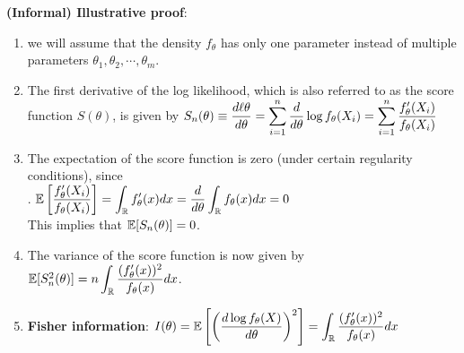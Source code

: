 \vspace{0.5cm}
\textbf{(Informal) Illustrative proof}:
\begin{enumerate}
    \item we will assume that the density $f_{\theta}$ has only one parameter instead of multiple parameters $\theta_1 , \theta_2, \cdots , \theta_m $.
    \hfill \cite{statistics/book/Statistics-for-Data-Scientists/Maurits-Kaptein}

    \item The first derivative of the log likelihood, which is also referred to as the score function $S(\theta)$, is given by
    $
        S_n (\theta )
        \equiv \dfrac{d\ell\theta }{d\theta}
        = \displaystyle\sum^n _{i=1} \dfrac{d} {d\theta}  \log f_\theta  (X_i )
        = \displaystyle\sum^n _{i=1} \dfrac{f^\prime_\theta  (X_i ) }{f_{\theta}  (X_i )}
    $
    \hfill \cite{statistics/book/Statistics-for-Data-Scientists/Maurits-Kaptein}

    \item The expectation of the score function is zero (under certain regularity conditions), since
    \hfill \cite{statistics/book/Statistics-for-Data-Scientists/Maurits-Kaptein}
    \\[0.2cm]
    .\hfill
    $
        \mathbb{E}\left[\dfrac{f ^\prime _\theta  (X_i )}{f_\theta  (X_i )}\right]
        = \displaystyle\int _{\mathbb{R}} f ^\prime _\theta  (x)dx
        = \dfrac{d} {d\theta}  \displaystyle\int _{\mathbb{R}} f_\theta  (x)dx
        = 0
    $
    \hfill \cite{statistics/book/Statistics-for-Data-Scientists/Maurits-Kaptein}
    \\[0.2cm]
    This implies that $\mathbb{E}[S_n (\theta)] = 0$.
    \hfill \cite{statistics/book/Statistics-for-Data-Scientists/Maurits-Kaptein}

    \item The variance of the score function is now given by $\mathbb{E}[S^2 _n (\theta )] = n \displaystyle\int _{\mathbb{R}}\dfrac{( f ^\prime _\theta  (x))^2}{f_\theta  (x)}dx$.
    \hfill \cite{statistics/book/Statistics-for-Data-Scientists/Maurits-Kaptein}

    \item \textbf{Fisher information}:
    $
        I (\theta ) 
        = \mathbb{E} \left[\left(\dfrac{d \log f_\theta  (X)}{d\theta }\right)^2 \right]
        = \displaystyle\int _{\mathbb{R}} \dfrac{( f ^\prime _\theta  (x))^2}{ f_\theta  (x)} dx
    $
    \hfill \cite{statistics/book/Statistics-for-Data-Scientists/Maurits-Kaptein}


\end{enumerate}
